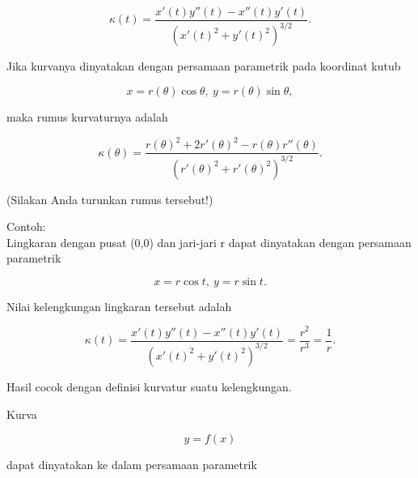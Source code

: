 \documentclass[a4paper,10pt]{article}
\begin{document}
\begin{eulernotebook}
\begin{eulercomment}
\end{eulercomment}
\begin{eulerformula}
\[
\kappa(t) = \frac{x'(t)y''(t)-x''(t)y'(t)}{\left(x'(t)^2+y'(t)^2\right)^{3/2}}.
\]
\end{eulerformula}
\begin{eulercomment}
Jika kurvanya dinyatakan dengan persamaan parametrik pada koordinat
kutub

\end{eulercomment}
\begin{eulerformula}
\[
x=r(\theta)\cos\theta,\ y=r(\theta)\sin\theta,
\]
\end{eulerformula}
\begin{eulercomment}
maka rumus kurvaturnya adalah

\end{eulercomment}
\begin{eulerformula}
\[
\kappa(\theta) = \frac{r(\theta)^2+2r'(\theta)^2-r(\theta)r''(\theta)}{\left(r'(\theta)^2+r'(\theta)^2\right)^{3/2}}.
\]
\end{eulerformula}
\begin{eulercomment}
(Silakan Anda turunkan rumus tersebut!)

Contoh:\\
Lingkaran dengan pusat (0,0) dan jari-jari r dapat dinyatakan dengan
persamaan parametrik

\end{eulercomment}
\begin{eulerformula}
\[
x=r\cos t,\ y=r\sin t.
\]
\end{eulerformula}
\begin{eulercomment}
Nilai kelengkungan lingkaran tersebut adalah

\end{eulercomment}
\begin{eulerformula}
\[
\kappa(t)=\frac{x'(t)y''(t)-x''(t)y'(t)}{\left(x'(t)^2+y'(t)^2\right)^{3/2}}=\frac{r^2}{r^3}=\frac 1 r.
\]
\end{eulerformula}
\begin{eulercomment}
Hasil cocok dengan definisi kurvatur suatu kelengkungan.
\end{eulercomment}
\begin{eulercomment}
Kurva

\end{eulercomment}
\begin{eulerformula}
\[
y=f(x)
\]
\end{eulerformula}
\begin{eulercomment}
dapat dinyatakan ke dalam persamaan parametrik


\end{eulercomment}
\end{eulernotebook}
\end{document}
